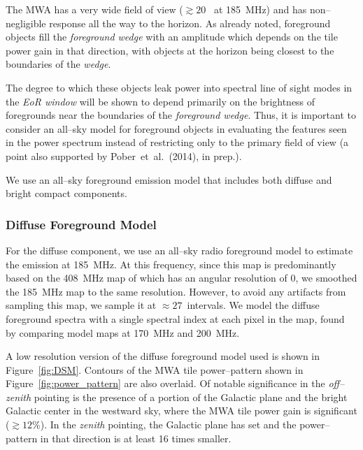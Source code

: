 \documentclass[preprint2,iop,numberedappendix]{emulateapj}
\begin{document}
The MWA has a very wide field of view ($\gtrsim 20$\arcdeg~ at 185~MHz) and has non--negligible response all the way to the horizon. As already noted, foreground objects fill the {\it foreground wedge} with an amplitude which depends on the tile power gain in that direction, with objects at the horizon being closest to the boundaries of the {\it wedge}. 

The degree to which these objects leak power into spectral line of sight modes in the {\it EoR window} will be shown to depend primarily on the brightness of foregrounds near the boundaries of the {\it foreground wedge}. Thus, it is important to consider an all--sky model for foreground objects in evaluating the features seen in the power spectrum instead of restricting only to the primary field of view (a point also supported by Pober~et~al.~(2014), in prep.). 


We use an all--sky foreground emission model that includes both diffuse and bright compact components.  

\subsubsection{Diffuse Foreground Model}\label{sec:DSM}

For the diffuse component, we use an all--sky radio foreground model \citep{deo08} to estimate the emission at 185~MHz. At this frequency, since this map is predominantly based on the 408~MHz map of \citet{has82} which has an angular resolution of 0, we smoothed the 185~MHz map to the same resolution. However, to avoid any artifacts from sampling this map, we sample it at $\approx 27$\arcmin~intervals. We model the diffuse foreground spectra with a single spectral index at each pixel in the map, found by comparing model maps at 170~MHz and 200~MHz.

A low resolution version of the diffuse foreground model used is shown in Figure~\ref{fig:DSM}. Contours of the MWA tile power--pattern shown in Figure~\ref{fig:power_pattern} are also overlaid. Of notable significance in the {\it off--zenith} pointing is the presence of a portion of the Galactic plane and the bright Galactic center in the westward sky, where the MWA tile power gain is significant ($\gtrsim 12$\%). In the {\it zenith} pointing, the Galactic plane has set and the power--pattern in that direction is at least 16 times smaller. 
\end{document}
